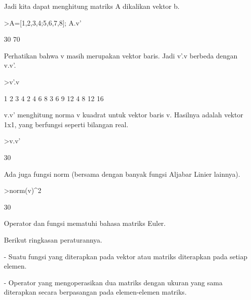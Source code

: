\begin{eulernotebook}
\begin{eulercomment}
\begin{eulercomment}
\begin{eulercomment}
Jadi kita dapat menghitung matriks A dikalikan vektor b.
\end{eulercomment}
\begin{eulerprompt}
>A=[1,2,3,4;5,6,7,8]; A.v'
\end{eulerprompt}
\begin{euleroutput}
             30 
             70 
\end{euleroutput}
\begin{eulercomment}
Perhatikan bahwa v masih merupakan vektor baris. Jadi v'.v berbeda
dengan v.v'.
\end{eulercomment}
\begin{eulerprompt}
>v'.v
\end{eulerprompt}
\begin{euleroutput}
              1             2             3             4 
              2             4             6             8 
              3             6             9            12 
              4             8            12            16 
\end{euleroutput}
\begin{eulercomment}
v.v' menghitung norma v kuadrat untuk vektor baris v. Hasilnya adalah
vektor 1x1, yang berfungsi seperti bilangan real.
\end{eulercomment}
\begin{eulerprompt}
>v.v'
\end{eulerprompt}
\begin{euleroutput}
  30
\end{euleroutput}
\begin{eulercomment}
Ada juga fungsi norm (bersama dengan banyak fungsi Aljabar Linier
lainnya).
\end{eulercomment}
\begin{eulerprompt}
>norm(v)^2
\end{eulerprompt}
\begin{euleroutput}
  30
\end{euleroutput}
\begin{eulercomment}
Operator dan fungsi mematuhi bahasa matriks Euler.

Berikut ringkasan peraturannya.

- Suatu fungsi yang diterapkan pada vektor atau matriks diterapkan
pada setiap elemen.

- Operator yang mengoperasikan dua matriks dengan ukuran yang sama
diterapkan secara berpasangan pada elemen-elemen matriks.


\end{eulercomment}
\end{eulercomment}
\end{eulercomment}
\end{eulernotebook}
